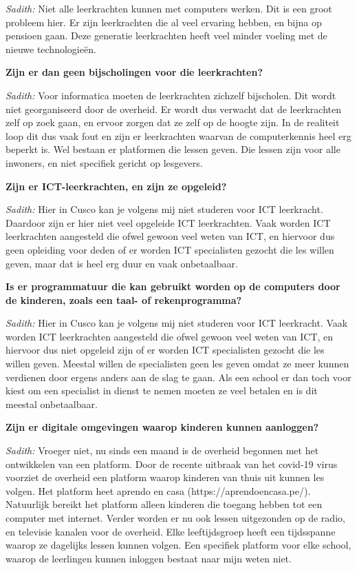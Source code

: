 \textit{Sadith:} Niet alle leerkrachten kunnen met computers werken. Dit is een groot probleem hier. Er zijn leerkrachten die al veel ervaring hebben, en bijna op pensioen gaan. Deze generatie leerkrachten heeft veel minder voeling met de nieuwe technologieën.

\textbf{Zijn er dan geen bijscholingen voor die leerkrachten?}

\textit{Sadith:} Voor informatica moeten de leerkrachten zichzelf bijscholen. Dit wordt niet georganiseerd door de overheid. Er wordt dus verwacht dat de leerkrachten zelf op zoek gaan, en ervoor zorgen dat ze zelf op de hoogte zijn. In de realiteit loop dit dus vaak fout en zijn er leerkrachten waarvan de computerkennis heel erg beperkt is. Wel bestaan er platformen die lessen geven. Die lessen zijn voor alle inwoners, en niet specifiek gericht op lesgevers.

\textbf{Zijn er ICT-leerkrachten, en zijn ze opgeleid?}

\textit{Sadith:} Hier in Cusco kan je volgens mij niet studeren voor ICT leerkracht. Daardoor zijn er hier niet veel opgeleide ICT leerkrachten. Vaak worden ICT leerkrachten aangesteld die ofwel gewoon veel weten van ICT, en hiervoor dus geen opleiding voor deden of er worden ICT specialisten gezocht die les willen geven, maar dat is heel erg duur en vaak onbetaalbaar.

\textbf{Is er programmatuur die kan gebruikt worden op de computers door de kinderen, zoals een taal- of rekenprogramma?}

\textit{Sadith:} Hier in Cusco kan je volgens mij niet studeren voor ICT leerkracht. Vaak worden ICT leerkrachten aangesteld die ofwel gewoon veel weten van ICT, en hiervoor dus niet opgeleid zijn of er worden ICT specialisten gezocht die les willen geven. Meestal willen de specialisten geen les geven omdat ze meer kunnen verdienen door ergens anders aan de slag te gaan. Als een school er dan toch voor kiest om een specialist in dienst te nemen moeten ze veel betalen en is dit meestal onbetaalbaar.
	
\textbf{Zijn er digitale omgevingen waarop kinderen kunnen aanloggen?}

\textit{Sadith:} Vroeger niet, nu sinds een maand is de overheid begonnen met het ontwikkelen van een platform. Door de recente uitbraak van het covid-19 virus voorziet de overheid een platform waarop kinderen van thuis uit kunnen les volgen. Het platform heet aprendo en casa (https://aprendoencasa.pe/). Natuurlijk bereikt het platform alleen kinderen die toegang hebben tot een computer met internet. Verder worden er nu ook lessen uitgezonden op de radio, en televisie kanalen voor de overheid. Elke leeftijdsgroep heeft een tijdsspanne waarop ze dagelijks lessen kunnen volgen. Een specifiek platform voor elke school, waarop de leerlingen kunnen inloggen bestaat naar mijn weten niet. 

